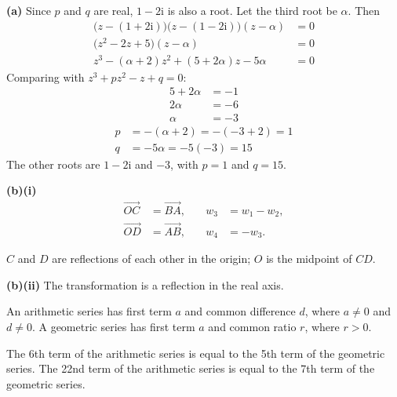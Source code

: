 \documentclass[a4paper,11pt,oneside]{article}
\newcommand{\Qhead}[1]{\par\needspace{14\baselineskip}\medskip\noindent{\large\bfseries #1}\par\smallskip}
\newcommand{\partlabel}[1]{\par\needspace{3\baselineskip}\smallskip\noindent\textbf{#1}\quad}
\begin{document}
\begin{solbox}
\partlabel{(a)}
Since $p$ and $q$ are real, $1-2\mathrm{i}$ is also a root.
Let the third root be $\alpha$. Then
\begin{align*}
\bigl(z-(1+2\mathrm{i})\bigr)\bigl(z-(1-2\mathrm{i})\bigr)(z-\alpha) &= 0\\
\bigl(z^2 - 2z + 5\bigr)(z-\alpha) &= 0\\
z^3 - (\alpha+2)z^2 + (5+2\alpha)z - 5\alpha &= 0
\end{align*}
Comparing with $z^3 + pz^2 - z + q = 0$:
\begin{align*}
5 + 2\alpha &= -1\\
2\alpha &= -6\\
\alpha &= -3
\end{align*}
\begin{align*}
p &= -(\alpha+2) = -(-3+2) = 1\\
q &= -5\alpha = -5(-3) = 15
\end{align*}
The other roots are $1-2\mathrm{i}$ and $-3$, with $p=1$ and $q=15$.
\partlabel{(b)(i)}
\begin{align*}
\overrightarrow{OC}&=\overrightarrow{BA},&\quad w_3&=w_1-w_2,\\
\overrightarrow{OD}&=\overrightarrow{AB},&\quad w_4&=-w_3.
\end{align*}
\begin{center}
\end{center}
$C$ and $D$ are reflections of each other in the origin; $O$ is the midpoint of $CD$.
\partlabel{(b)(ii)}
The transformation is a reflection in the real axis.
\end{solbox}
\clearpage
\Qhead{4}
An arithmetic series has first term $a$ and common difference $d$, where $a\neq 0$ and $d\neq 0$. A geometric series has first term $a$ and common ratio $r$, where $r>0$.

The 6th term of the arithmetic series is equal to the 5th term of the geometric series.
The 22nd term of the arithmetic series is equal to the 7th term of the geometric series.
\end{document}
